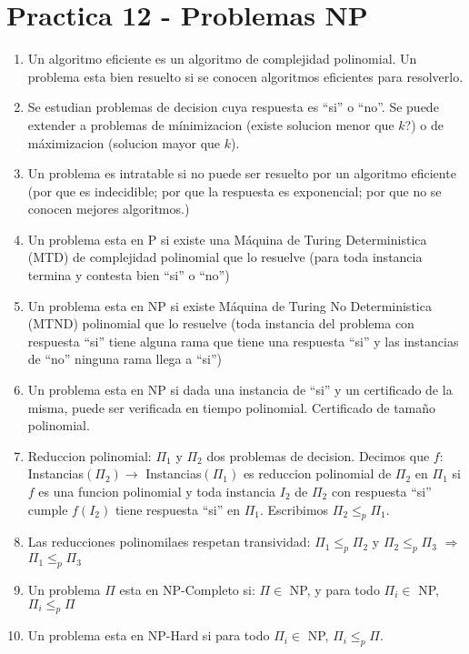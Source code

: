 \section{Practica 12 - Problemas NP}

\begin{enumerate}
\item Un algoritmo eficiente es un algoritmo de complejidad polinomial. Un problema esta bien resuelto si se conocen algoritmos eficientes para resolverlo.
\item Se estudian problemas de decision cuya respuesta es ``si'' o ``no''. Se puede extender a problemas de mínimizacion (existe solucion menor que $k$?) o de máximizacion (solucion mayor que $k$).
\item Un problema es intratable si no puede ser resuelto por un algoritmo eficiente (por que es indecidible; por que la respuesta es exponencial; por que no se conocen mejores algoritmos.)
\item Un problema esta en P si existe una Máquina de Turing Deterministica (MTD) de complejidad polinomial que lo resuelve (para toda instancia termina y contesta bien ``si'' o ``no'')
\item Un problema esta en NP si existe Máquina de Turing No Deterministica (MTND) polinomial que lo resuelve (toda instancia del problema con respuesta ``si'' tiene alguna rama que tiene una respuesta ``si'' y las instancias de ``no'' ninguna rama llega a ``si'')
\item Un problema esta en NP si dada una instancia de ``si'' y un certificado de la misma, puede ser verificada en tiempo polinomial. Certificado de tamaño polinomial.
\item Reduccion polinomial: $\Pi_{1}$ y $\Pi_{2}$ dos problemas de decision. Decimos que $f:$ Instancias$(\Pi_{2}) \rightarrow$ Instancias$(\Pi_{1})$ es reduccion polinomial de $\Pi_{2}$ en $\Pi_{1}$ si $f$ es una funcion polinomial y toda instancia $I_{2}$ de $\Pi_{2}$ con respuesta ``si'' cumple $f(I_{2})$ tiene respuesta ``si'' en $\Pi_{1}$. Escribimos $\Pi_{2} \leq_{p} \Pi_{1}$.
\item Las reducciones polinomilaes respetan transividad: $\Pi_{1} \leq_{p} \Pi_{2}$ y $\Pi_{2} \leq_{p} \Pi_{3}$ $\Rightarrow$ $\Pi_{1} \leq_{p} \Pi_{3}$
\item Un problema $\Pi$ esta en NP-Completo si: $\Pi \in$ NP, y para todo $\Pi_{i} \in$ NP, $\Pi_{i} \leq_{p} \Pi$
\item Un problema esta en NP-Hard si para todo $\Pi_{i} \in$ NP, $\Pi_{i} \leq_{p} \Pi$.

\end{enumerate}
